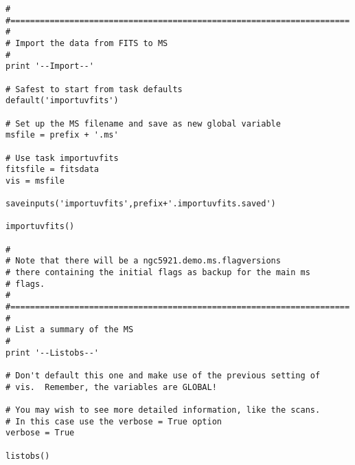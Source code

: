 \begin{verbatim}
#
#=====================================================================
#
# Import the data from FITS to MS
#
print '--Import--'

# Safest to start from task defaults
default('importuvfits')

# Set up the MS filename and save as new global variable
msfile = prefix + '.ms'

# Use task importuvfits
fitsfile = fitsdata
vis = msfile

saveinputs('importuvfits',prefix+'.importuvfits.saved')

importuvfits()

#
# Note that there will be a ngc5921.demo.ms.flagversions
# there containing the initial flags as backup for the main ms
# flags.
#
#=====================================================================
#
# List a summary of the MS
#
print '--Listobs--'

# Don't default this one and make use of the previous setting of
# vis.  Remember, the variables are GLOBAL!

# You may wish to see more detailed information, like the scans.
# In this case use the verbose = True option
verbose = True

listobs()


\end{verbatim}
